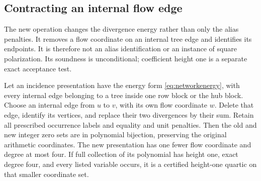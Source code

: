 \subsection{Contracting an internal flow edge}
The new operation changes the divergence energy rather than only the
alias penalties. It removes a flow coordinate on an internal tree edge
and identifies its endpoints. It is therefore not an alias identification
or an instance of square polarization. Its soundness is unconditional;
coefficient height one is a separate exact acceptance test.

\begin{theorem}\label{thm:contraction}
Let an incidence presentation have the energy form
\eqref{eq:networkenergy}, with every internal edge belonging to a tree
inside one row block or the hub block. Choose an internal edge from $u$
to $v$, with its own flow coordinate $w$. Delete that edge, identify its
vertices, and replace their two divergences by their sum. Retain all
prescribed occurrence labels and equality and unit penalties. Then the
old and new integer zero sets are in polynomial bijection, preserving
the original arithmetic coordinates. The new presentation has one fewer
flow coordinate and degree at most four. If full collection of its
polynomial has height one, exact degree four, and every listed variable
occurs, it is a certified height-one quartic on that smaller coordinate set.
\end{theorem}
